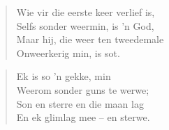 \begin{verse}
Wie vir die eerste keer verlief is, \\ 
Selfs sonder weermin, is ’n God, \\ 
Maar hij, die weer ten tweedemale \\ 
Onweerkerig min, is sot. \\ 
\end{verse}

\begin{verse}
Ek is so ’n gekke, min \\ 
Weerom sonder guns te werwe; \\ 
Son en sterre en die maan lag \\ 
En ek glimlag mee -- en sterwe. \\ 
\end{verse}